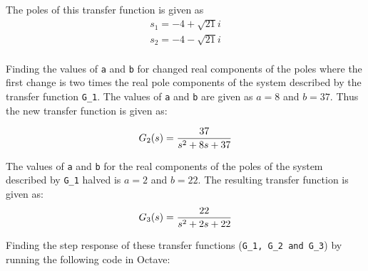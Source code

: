 \documentclass[a4paper, 12pt]{article}
\begin{document}
		The poles of this transfer function is given as 
		\begin{equation}
			\begin{array}{rcl}
				s_1 = -4 + \sqrt{21}i\\
				s_2 = -4 - \sqrt{21}i\\
			\end{array}
		\end{equation}

		Finding the values of \texttt{a} and \texttt{b} for changed real components of the poles where the first change is two times the real pole components of the system described by the transfer function \texttt{G\_1}. The values of \texttt{a} and \texttt{b} are given as $a = 8$ and $b = 37$. Thus the new transfer function is given as:

		\begin{equation}
			G_2(s) = \frac{37}{s^2+8s+37}\\
		\end{equation}

		The values of \texttt{a} and \texttt{b} for the real components of the poles of the system described by \texttt{G\_1} halved is $a = 2$ and $b = 22$. The resulting transfer function is given as:
		\begin{equation}
			G_3(s) = \frac{22}{s^2+2s+22}\\
		\end{equation}

		Finding the step response of these transfer functions (\texttt{G\_1, G\_2 and G\_3}) by running the following code in Octave:
\end{document}
